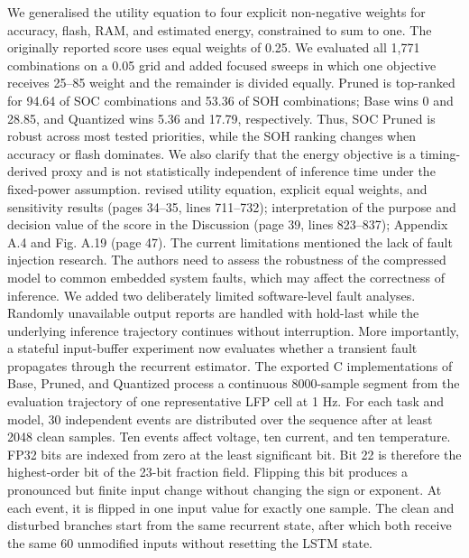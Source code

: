 {} We generalised the utility equation to four explicit non-negative weights for accuracy, flash, RAM, and estimated energy, constrained to sum to one. The originally reported score uses equal weights of 0.25. We evaluated all 1,771 combinations on a 0.05 grid and added focused sweeps in which one objective receives 25--85\markdownRendererPercentSign{} weight and the remainder is divided equally. Pruned is top-ranked for 94.64\markdownRendererPercentSign{} of SOC combinations and 53.36\markdownRendererPercentSign{} of SOH combinations; Base wins 0\markdownRendererPercentSign{} and 28.85\markdownRendererPercentSign{}, and Quantized wins 5.36\markdownRendererPercentSign{} and 17.79\markdownRendererPercentSign{}, respectively. Thus, SOC Pruned is robust across most tested priorities, while the SOH ranking changes when accuracy or flash dominates. We also clarify that the energy objective is a timing-derived proxy and is not statistically independent of inference time under the fixed-power assumption.\markdownRendererParagraphSeparator
{} revised utility equation, explicit equal weights, and sensitivity results (pages 34--35, lines 711--732); interpretation of the purpose and decision value of the score in the Discussion (page 39, lines 823--837); Appendix A.4 and Fig. A.19 (page 47).\markdownRendererInterblockSeparator
{}
\markdownRendererSectionEnd \markdownRendererSectionBegin
{}\markdownRendererInterblockSeparator
{}\markdownRendererBlockQuoteBegin
The current limitations mentioned the lack of fault injection research. The authors need to assess the robustness of the compressed model to common embedded system faults, which may affect the correctness of inference.\markdownRendererBlockQuoteEnd \markdownRendererInterblockSeparator
{} We added two deliberately limited software-level fault analyses. Randomly unavailable output reports are handled with hold-last while the underlying inference trajectory continues without interruption. More importantly, a stateful input-buffer experiment now evaluates whether a transient fault propagates through the recurrent estimator. The exported C implementations of Base, Pruned, and Quantized process a continuous 8000-sample segment from the evaluation trajectory of one representative LFP cell at 1 Hz. For each task and model, 30 independent events are distributed over the sequence after at least 2048 clean samples. Ten events affect voltage, ten current, and ten temperature. FP32 bits are indexed from zero at the least significant bit. Bit 22 is therefore the highest-order bit of the 23-bit fraction field. Flipping this bit produces a pronounced but finite input change without changing the sign or exponent. At each event, it is flipped in one input value for exactly one sample. The clean and disturbed branches start from the same recurrent state, after which both receive the same 60 unmodified inputs without resetting the LSTM state.\markdownRendererParagraphSeparator
